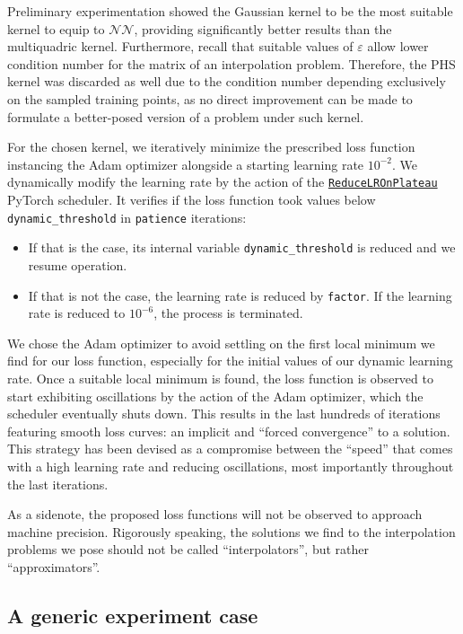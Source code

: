 \documentclass[12pt]{report} %
\begin{document}
Preliminary experimentation showed the Gaussian kernel to be the most suitable kernel to equip to $\mathcal{NN}$, providing significantly better results than the multiquadric kernel. Furthermore, recall that suitable values of $\varepsilon$ allow lower condition number for the matrix of an interpolation problem. Therefore, the PHS kernel was discarded as well due to the condition number depending exclusively on the sampled training points, as no direct improvement can be made to formulate a better-posed version of a problem under such kernel.

For the chosen kernel, we iteratively minimize the prescribed loss function instancing the Adam optimizer alongside a starting learning rate $10^{-2}$. We dynamically modify the learning rate by the action of the \href{https://pytorch.org/docs/stable/generated/torch.optim.lr_scheduler.ReduceLROnPlateau.html}{\texttt{ReduceLROnPlateau}} PyTorch scheduler. It verifies if the loss function took values below \texttt{dynamic\_threshold} in \texttt{patience} iterations:
\begin{itemize}
  \item If that is the case, its internal variable \texttt{dynamic\_threshold} is reduced and we resume operation.
  \item If that is not the case, the learning rate is reduced by \texttt{factor}. If the learning rate is reduced to $10^{-6}$, the process is terminated.
\end{itemize}

We chose the Adam optimizer to avoid settling on the first local minimum we find for our loss function, especially for the initial values of our dynamic learning rate. Once a suitable local minimum is found, the loss function is observed to start exhibiting oscillations by the action of the Adam optimizer, which the scheduler eventually shuts down. This results in the last hundreds of iterations featuring smooth loss curves: an implicit and ``forced convergence'' to a solution. This strategy has been devised as a compromise between the ``speed'' that comes with a high learning rate and reducing oscillations, most importantly throughout the last iterations.

As a sidenote, the proposed loss functions will not be observed to approach machine precision. Rigorously speaking, the solutions we find to the interpolation problems we pose should not be called ``interpolators'', but rather ``approximators''.

\subsection{A generic experiment case}
\end{document}
